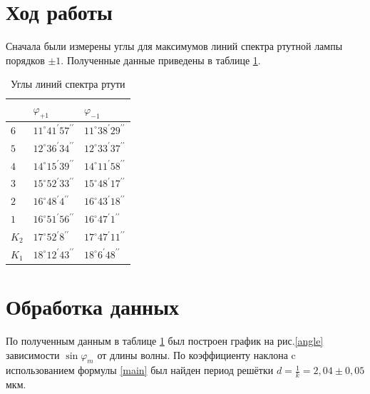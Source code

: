 \documentclass[a4paper, 12pt]{article}
\begin{document}
\section{Ход работы}

Сначала были измерены углы для максимумов линий спектра ртутной лампы порядков $\pm 1$. Полученные данные приведены в таблице \ref{angles}.

\begin{table}[H]
    \centering
    \begin{tabular}{|p{2cm}|p{4cm}|p{4cm}|}
    \hline  \centering{№ линии} & $\varphi_{+1}$ &  $\varphi_{-1}$ \\ \hline
$6$   & $11^{\circ} 41^{\prime} 57^{\prime \prime}$  & $11^{\circ} 38^{\prime} 29^{\prime \prime}$  \\ \hline
$5$   & $12^{\circ} 36^{\prime} 34^{\prime \prime}$  & $12^{\circ} 33^{\prime} 37^{\prime \prime}$  \\ \hline
$4$   & $14^{\circ} 15^{\prime} 39^{\prime \prime}$  & $14^{\circ} 11^{\prime} 58^{\prime \prime}$  \\ \hline
$3$   & $15^{\circ} 52^{\prime} 33^{\prime \prime}$  & $15^{\circ} 48^{\prime} 17^{\prime \prime}$  \\ \hline
$2$   & $16^{\circ} 48^{\prime}  4^{\prime \prime}$  & $16^{\circ} 43^{\prime} 18^{\prime \prime}$  \\ \hline
$1$   & $16^{\circ} 51^{\prime} 56^{\prime \prime}$  & $16^{\circ} 47^{\prime} 1^{\prime \prime}$  \\ \hline
$K_2$ & $17^{\circ} 52^{\prime}  8^{\prime \prime}$  & $17^{\circ} 47^{\prime} 11^{\prime \prime}$  \\ \hline
$K_1$ & $18^{\circ} 12^{\prime} 43^{\prime \prime}$  & $18^{\circ}  6^{\prime } 48^{\prime \prime}$  \\ \hline

        
    
    \end{tabular}
    \caption{Углы линий спектра ртути}
    \label{angles}
\end{table}


\section{Обработка данных}

По полученным данным в таблице \ref{angles} был построен график на рис.\ref{angle} зависимости $\sin \varphi_m$ от длины волны. По коэффициенту наклона c использованием формулы \eqref{main} был найден период решётки $d = \frac{1}{k} = 2,04 \pm 0,05$ мкм.
\end{document}
